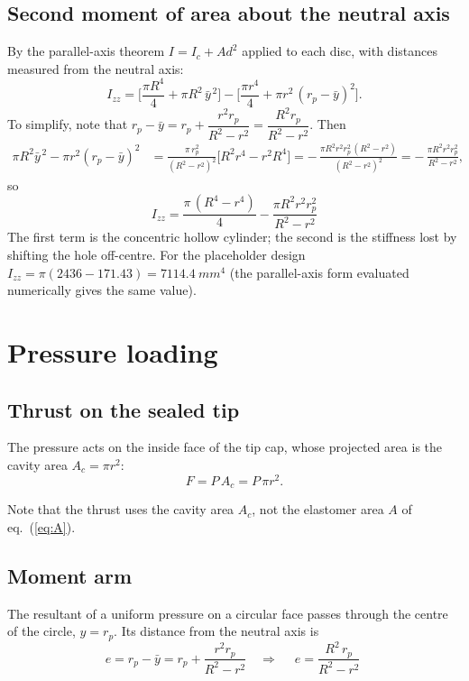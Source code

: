 \documentclass[11pt,a4paper]{article}
\numberwithin{equation}{section}
\newcommand{\Izz}{I_{zz}}
\newcommand{\rp}{r_p}
\begin{document}
\subsection{Second moment of area about the neutral axis}
By the parallel-axis theorem $I = I_c + A d^2$ applied to each disc, with distances measured from the neutral axis:
\begin{equation}
\Izz = \Big[\frac{\pi R^4}{4} + \pi R^2\,\bar y^{\,2}\Big] - \Big[\frac{\pi r^4}{4} + \pi r^2\,(\rp-\bar y)^2\Big].
\end{equation}
To simplify, note that $\rp - \bar y = \rp + \dfrac{r^2\rp}{R^2-r^2} = \dfrac{R^2\rp}{R^2-r^2}$. Then
\begin{align}
\pi R^2\bar y^{\,2} - \pi r^2(\rp-\bar y)^2
&= \frac{\pi\,\rp^2}{(R^2-r^2)^2}\Big[R^2 r^4 - r^2 R^4\Big]
 = -\,\frac{\pi R^2 r^2 \rp^2\,(R^2-r^2)}{(R^2-r^2)^2}
 = -\,\frac{\pi R^2 r^2 \rp^2}{R^2-r^2},
\end{align}
so
\begin{equation}
\boxed{\;\Izz = \frac{\pi\,(R^4-r^4)}{4} - \frac{\pi R^2 r^2 \rp^2}{R^2-r^2}\;} \label{eq:I}
\end{equation}
The first term is the concentric hollow cylinder; the second is the stiffness lost by shifting the hole off-centre.
For the placeholder design $\Izz = \pi(2436 - 171.43) = \SI{7114.4}{mm^4}$
(the parallel-axis form evaluated numerically gives the same value).

\section{Pressure loading}\label{sec:load}

\subsection{Thrust on the sealed tip}
The pressure acts on the inside face of the tip cap, whose projected area is the cavity area $A_c = \pi r^2$:
\begin{equation}
F = P\,A_c = P\,\pi r^2 . \label{eq:F}
\end{equation}

Note that the thrust uses the cavity area $A_c$, not the elastomer area $A$ of eq.~(\ref{eq:A}).

\subsection{Moment arm}
The resultant of a uniform pressure on a circular face passes through the centre of the circle, $y=\rp$.
Its distance from the neutral axis is
\begin{equation}
e = \rp - \bar y = \rp + \frac{r^2\rp}{R^2-r^2}
\quad\Longrightarrow\quad
\boxed{\;e = \frac{R^2\,\rp}{R^2-r^2}\;} \label{eq:e}
\end{equation}
\end{document}
